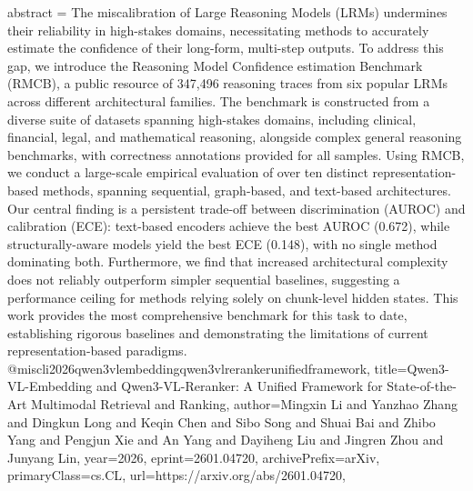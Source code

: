 {      abstract = {The miscalibration of Large Reasoning Models (LRMs) undermines their reliability in high-stakes domains, necessitating methods to accurately estimate the confidence of their long-form, multi-step outputs. To address this gap, we introduce the Reasoning Model Confidence estimation Benchmark (RMCB), a public resource of 347,496 reasoning traces from six popular LRMs across different architectural families. The benchmark is constructed from a diverse suite of datasets spanning high-stakes domains, including clinical, financial, legal, and mathematical reasoning, alongside complex general reasoning benchmarks, with correctness annotations provided for all samples. Using RMCB, we conduct a large-scale empirical evaluation of over ten distinct representation-based methods, spanning sequential, graph-based, and text-based architectures. Our central finding is a persistent trade-off between discrimination (AUROC) and calibration (ECE): text-based encoders achieve the best AUROC (0.672), while structurally-aware models yield the best ECE (0.148), with no single method dominating both. Furthermore, we find that increased architectural complexity does not reliably outperform simpler sequential baselines, suggesting a performance ceiling for methods relying solely on chunk-level hidden states. This work provides the most comprehensive benchmark for this task to date, establishing rigorous baselines and demonstrating the limitations of current representation-based paradigms.}
}@misc{li2026qwen3vlembeddingqwen3vlrerankerunifiedframework,
      title={Qwen3-VL-Embedding and Qwen3-VL-Reranker: A Unified Framework for State-of-the-Art Multimodal Retrieval and Ranking}, 
      author={Mingxin Li and Yanzhao Zhang and Dingkun Long and Keqin Chen and Sibo Song and Shuai Bai and Zhibo Yang and Pengjun Xie and An Yang and Dayiheng Liu and Jingren Zhou and Junyang Lin},
      year={2026},
      eprint={2601.04720},
      archivePrefix={arXiv},
      primaryClass={cs.CL},
      url={https://arxiv.org/abs/2601.04720},
}
